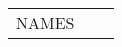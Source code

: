 \documentclass[a4paper]{scrartcl}
\begin{document}
\begin{longtable}{m{}|m{}|m{}}
NAMES
\end{longtable}
\end{document}
